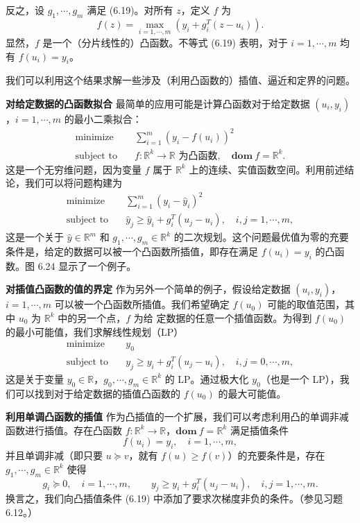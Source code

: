 \documentclass[UTF8, 12pt, fontset=fandol, oneside]{ctexart}
\begin{document}
反之，设 $g_1,\cdots,g_m$ 满足 (6.19)。对所有 $z$，定义 $f$ 为
\[
f(z)=\max_{i=1,\cdots,m}\left(y_i+g_i^T(z-u_i)\right).
\]
显然，$f$ 是一个（分片线性的）凸函数。不等式 (6.19) 表明，对于 $i=1,\cdots,m$ 均有 $f(u_i)=y_i$。

我们可以利用这个结果求解一些涉及（利用凸函数的）插值、逼近和定界的问题。

\noindent\textbf{对给定数据的凸函数拟合}\quad
最简单的应用可能是计算凸函数对于给定数据 $(u_i,y_i)$，$i=1,\cdots,m$ 的最小二乘拟合：
\[
\begin{aligned}
\text{minimize}\quad & \sum_{i=1}^m(y_i-f(u_i))^2\\
\text{subject to}\quad & f:\mathbb{R}^k\to\mathbb{R}\text{ 为凸函数},\quad \mathbf{dom}\ f=\mathbb{R}^k.
\end{aligned}
\]
这是一个无穷维问题，因为变量 $f$ 属于 $\mathbb{R}^k$ 上的连续、实值函数空间。利用前述结论，我们可以将问题构建为
\[
\begin{aligned}
\text{minimize}\quad & \sum_{i=1}^m(y_i-\hat{y}_i)^2\\
\text{subject to}\quad & \hat{y}_j\geq \hat{y}_i+g_i^T(u_j-u_i),\quad i,j=1,\cdots,m,
\end{aligned}
\]
这是一个关于 $\hat{y}\in\mathbb{R}^m$ 和 $g_1,\cdots,g_m\in\mathbb{R}^k$ 的二次规划。这个问题最优值为零的充要条件是，给定的数据可以被一个凸函数所插值，即存在满足 $f(u_i)=y_i$ 的凸函数。图 6.24 显示了一个例子。

\noindent\textbf{对插值凸函数的值的界定}\quad
作为另外一个简单的例子，假设给定数据 $(u_i,y_i)$，$i=1,\cdots,m$ 可以被一个凸函数所插值。我们希望确定 $f(u_0)$ 可能的取值范围，其中 $u_0$ 为 $\mathbb{R}^k$ 中的另一个点，$f$ 为给
定数据的任意一个插值函数。为得到 $f(u_0)$ 的最小可能值，我们求解线性规划（LP）
\[
\begin{aligned}
\text{minimize}\quad & y_0\\
\text{subject to}\quad & y_j\geq y_i+g_i^T(u_j-u_i),\quad i,j=0,\cdots,m,
\end{aligned}
\]
这是关于变量 $y_0\in\mathbb{R}$，$g_0,\cdots,g_m\in\mathbb{R}^k$ 的 LP。通过极大化 $y_0$（也是一个 LP），我们可以找到对于给定数据的插值凸函数的 $f(u_0)$ 的最大可能值。

\noindent\textbf{利用单调凸函数的插值}\quad
作为凸插值的一个扩展，我们可以考虑利用凸的单调非减函数进行插值。存在凸函数 $f:\mathbb{R}^k\to\mathbb{R}$，$\mathbf{dom}\ f=\mathbb{R}^k$ 满足插值条件
\[
f(u_i)=y_i,\quad i=1,\cdots,m,
\]
并且单调非减（即只要 $u\succeq v$，就有 $f(u)\geq f(v)$）的充要条件是，存在 $g_1,\cdots,g_m\in\mathbb{R}^k$ 使得
\begin{equation}
g_i\succeq 0,\quad i=1,\cdots,m,\qquad y_j\geq y_i+g_i^T(u_j-u_i),\quad i,j=1,\cdots,m.
\tag{6.21}
\end{equation}
换言之，我们向凸插值条件 (6.19) 中添加了要求次梯度非负的条件。（参见习题 6.12。）
\end{document}
